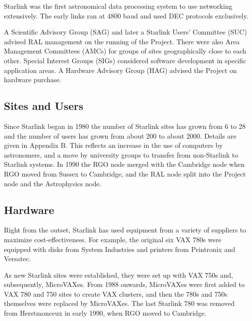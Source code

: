 \documentclass[twoside,11pt]{article}
\newenvironment{latexonly}{}{}
\begin{document}
Starlink was the first astronomical data processing system to use networking
extensively.
The early links ran at 4800 baud and used DEC protocols exclusively.

A Scientific Advisory Group (SAG) and later a Starlink Users' Committee (SUC)
advised RAL management on the running of the Project.
There were also Area Management Committees (AMCs) for groups of sites
geographically close to each other.
Special Interest Groups (SIGs) considered software development in specific
application areas.
A Hardware Advisory Group (HAG) advised the Project on hardware purchase.

\subsection*{Sites and Users}

Since Starlink began in 1980 the number of Starlink sites has grown from 6
to 28 and the number of users has grown from about 200 to about 2000.
\begin{latexonly}
Details are given in Appendix B.
\end{latexonly}
This reflects an increase in the use of computers by astronomers, and a
move by university groups to transfer from non-Starlink to Starlink systems.
In 1990 the RGO node merged with the Cambridge node when RGO moved from
Sussex to Cambridge, and the RAL node split into the Project node and the
Astrophysics node.

\subsection*{Hardware}

Right from the outset, Starlink has used equipment from a variety of suppliers
to maximize cost-effectiveness.
For example, the original six VAX 780s were equipped with disks from System
Industries and printers from Printronix and Versatec.

As new Starlink sites were established, they were set up with VAX 750s and,
subsequently, MicroVAXes.
From 1988 onwards, MicroVAXes were first added to VAX 780 and 750 sites to
create VAX clusters, and then the 780s and 750s themselves were replaced by
MicroVAXes.
The last Starlink 780 was removed from Herstmonceux in early 1990, when RGO
moved to Cambridge.
\end{document}
